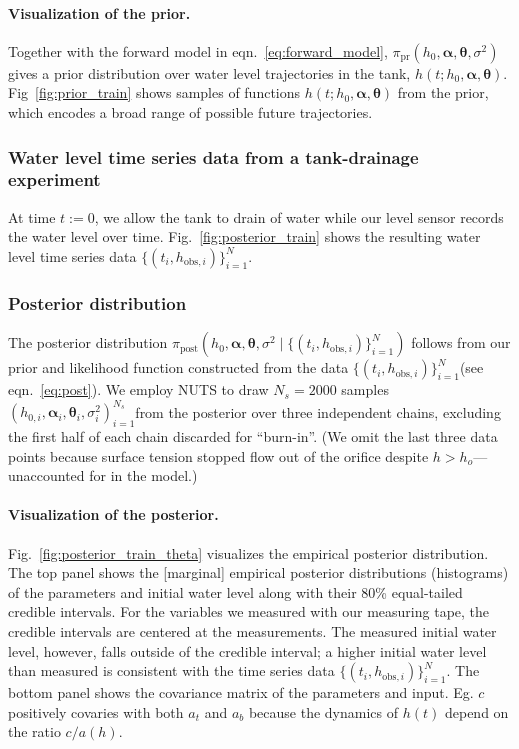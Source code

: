 \documentclass[openacc]{rsproca_new}%
\newcommand\thedata {$\{(t_i,h_{\text{obs}, i})\}_{i=1}^{N}$\xspace}
\newcommand\thedatanomath {\{(t_i,h_{\text{obs}, i})\}_{i=1}^{N}}
\newcommand\themodel {$h(t; h_0, \boldsymbol \alpha, \boldsymbol\theta)$\xspace}
\newcommand\thesamples{$(h_{0, i}, \boldsymbol \alpha_i, \boldsymbol \theta_i, \sigma_i^2)_{i=1}^{N_s}$}
\begin{document}
\paragraph{Visualization of the prior.}
Together with the forward model in eqn.~\ref{eq:forward_model}, $\pi_{\text{pr}}(h_0, \boldsymbol \alpha, \boldsymbol \theta, \sigma^2)$ gives a prior distribution over water level trajectories in the tank, \themodel. 
Fig~\ref{fig:prior_train} shows samples of functions \themodel from the prior, which encodes a broad range of possible future trajectories. 

\subsubsection{Water level time series data from a tank-drainage experiment} At time $t:=0$, we allow the tank to drain of water while our level sensor records the water level over time. 
Fig.~\ref{fig:posterior_train} shows the resulting water level time series data \thedata.

\subsubsection{Posterior distribution}
The posterior distribution $\pi_{\text{post}}(h_0, \boldsymbol \alpha, \boldsymbol \theta, \sigma^2 \mid \thedatanomath)$ follows from our prior and likelihood function constructed from the data \thedata (see eqn.~\ref{eq:post}). 
We employ NUTS to draw $N_s=2000$ samples \thesamples from the posterior over three independent chains, excluding the first half of each chain discarded for ``burn-in''. 
(We omit the last three data points because surface tension stopped flow out of the orifice despite $h>h_o$---unaccounted for in the model.)


\paragraph{Visualization of the posterior.}Fig.~\ref{fig:posterior_train_theta} visualizes the empirical posterior distribution. 
The top panel shows the [marginal] empirical posterior distributions (histograms) of the parameters and initial water level along with their 80\% equal-tailed credible intervals. 
For the variables we measured with our measuring tape, the credible intervals are centered at the measurements. 
The measured initial water level, however, falls outside of the credible interval; a higher initial water level than measured is consistent with the time series data \thedata.
The bottom panel shows the covariance matrix of the parameters and input. Eg. $c$ positively covaries with both $a_t$ and $a_b$ because the dynamics of $h(t)$ depend on the ratio $c/a(h)$.
\end{document}
